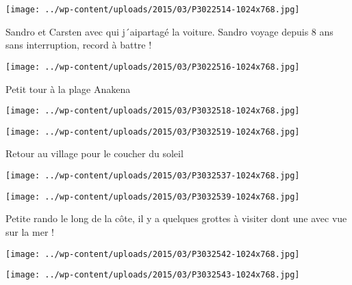  

\begin{center} \texttt{[image: ../wp-content/uploads/2015/03/P3022514-1024x768.jpg]} \end{center}



 Sandro et Carsten avec qui j´aipartagé la voiture. Sandro voyage depuis 8 ans sans interruption, record à battre !

\begin{center} \texttt{[image: ../wp-content/uploads/2015/03/P3022516-1024x768.jpg]} \end{center}

Petit tour à la plage Anakena

 

\begin{center} \texttt{[image: ../wp-content/uploads/2015/03/P3032518-1024x768.jpg]} \end{center}

 

\begin{center} \texttt{[image: ../wp-content/uploads/2015/03/P3032519-1024x768.jpg]} \end{center}

Retour au village pour le coucher du soleil

 

\begin{center} \texttt{[image: ../wp-content/uploads/2015/03/P3032537-1024x768.jpg]} \end{center}

 

\begin{center} \texttt{[image: ../wp-content/uploads/2015/03/P3032539-1024x768.jpg]} \end{center}



 Petite rando le long de la côte, il y a quelques grottes à visiter dont une avec vue sur la mer !

 

\begin{center} \texttt{[image: ../wp-content/uploads/2015/03/P3032542-1024x768.jpg]} \end{center}

 

\begin{center} \texttt{[image: ../wp-content/uploads/2015/03/P3032543-1024x768.jpg]} \end{center}



